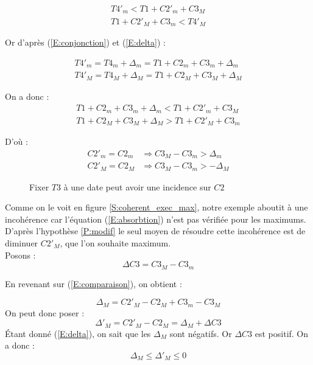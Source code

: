 \documentclass[10pt,a4paper]{article}
\newcommand{\hyporef}[1]{l'hypothèse \ref{#1}}
\begin{document}
	\begin{eqnarray}
		T4'_m < T1 + C2'_m + C3_M \\
		T1 + C2'_M + C3_m < T4'_M \nonumber
	\end{eqnarray}

Or d'après (\ref{E:conjonction}) et (\ref{E:delta}) :

	\begin{eqnarray}
		T4'_m = T4_m + \Delta{}_m = T1 + C2_m + C3_m + \Delta{}_m \\
		T4'_M = T4_M + \Delta{}_M = T1 + C2_M + C3_M + \Delta{}_M \nonumber
	\end{eqnarray}

On a donc :
	\begin{eqnarray}
		\label{E:comparaison}
		T1 + C2_m + C3_m + \Delta{}_m < T1 + C2'_m + C3_M \\
		T1 + C2_M + C3_M + \Delta{}_M > T1 + C2'_M + C3_m  \nonumber
	\end{eqnarray}

D'où :
	\begin{eqnarray}
		\label{E:absorbtion}
		C2'_m = C2_m &\Rightarrow C3_M - C3_m > \Delta{}_m \\
		C2'_M = C2_M &\Rightarrow C3_M - C3_m > -\Delta{}_M \nonumber
	\end{eqnarray}


	\begin{figure}[htp]
		\begin{center}
			\hspace{5pt}
	
		\caption{Fixer $T3$ à une date peut avoir une incidence sur $C2$}
		\end{center}
	\end{figure}

Comme on le voit en figure \ref{S:coherent_exec_max}, notre exemple aboutit à une incohérence car l'équation (\ref{E:absorbtion}) n'est pas vérifiée pour les maximums. D'après \hyporef{P:modif} le seul moyen de résoudre cette incohérence est de diminuer $C2'_M$, que l'on souhaite maximum. \\
Posons : $$\Delta{C3} = C3_M - C3_m$$

En revenant sur (\ref{E:comparaison}), on obtient :

	\begin{equation}
		\Delta{}_M = C2'_M - C2_M + C3_m - C3_M \nonumber
	\end{equation}
On peut donc poser : 
	\begin{equation}
		\Delta{'}_M = C2'_M - C2_M = \Delta{}_M + \Delta{C3} 
	\end{equation}
Étant donné (\ref{E:delta}), on sait que les $\Delta{}_M$ sont négatifs. Or $\Delta{C3}$ est positif. On a donc : 
	\begin{equation}
		\Delta{}_M  \leq \Delta{'}_M  \leq 0
	\end{equation}
\end{document}

